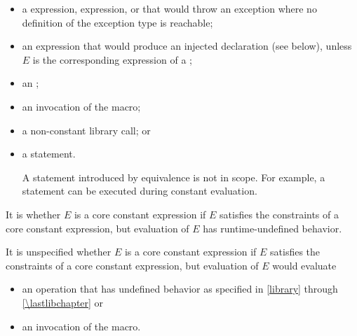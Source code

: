 \begin{itemize}
\item
a  expression,
 expression, or
that would throw an exception
where no definition of the exception type is reachable;

\item
an expression that would produce an injected declaration (see below),
unless $E$ is the corresponding expression of
a ;

\item
an ;

\item
an invocation of the  macro;

\item
a non-constant library call;
or

\item
a  statement.
\begin{note}
A  statement introduced by equivalence
is not in scope.
For example, a  statement
can be executed during constant evaluation.
\end{note}
\end{itemize}

\pnum
It is
whether $E$ is a core constant expression
if $E$ satisfies the constraints of a core constant expression, but
evaluation of $E$ has runtime-undefined behavior.

\pnum
It is unspecified whether $E$ is a core constant expression
if $E$ satisfies the constraints of a core constant expression, but
evaluation of $E$ would evaluate
\begin{itemize}
\item
an operation that has undefined behavior
as specified in \ref{library} through \ref{\lastlibchapter} or
\item
an invocation of the  macro.
\end{itemize}

